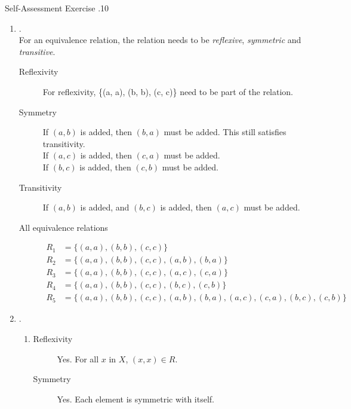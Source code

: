 \documentclass[\main/notes.tex]{subfiles}
\begin{document}
				\begin{exercise}{Self-Assessment Exercise \thechapter.10}
					\begin{enumerate}
						\item {}.\\
							For an equivalence relation, the relation needs to be \emph{reflexive}, \emph{symmetric} and \emph{transitive}.
							\begin{description}
								\item[Reflexivity] For reflexivity, \{(a, a), (b, b), (c, c)\} need to be part of the relation.
								\item[Symmetry] If $(a, b)$ is added, then $(b, a)$ must be added. This still satisfies transitivity.\\
								If $(a, c)$ is added, then $(c, a)$ must be added.\\
								If $(b, c)$ is added, then $(c, b)$ must be added.
								\item[Transitivity] If $(a, b)$ is added, and $(b, c)$ is added, then $(a, c)$ must be added.
								\item[All equivalence relations]
									\begin{align*}
										R_{1} &= \bigl\{(a, a), (b, b), (c, c)\bigr\}\\
										R_{2} &= \bigl\{(a, a), (b, b), (c, c), (a, b), (b, a)\bigr\}\\
										R_{3} &= \bigl\{(a, a), (b, b), (c, c), (a, c), (c, a)\bigr\}\\
										R_{4} &= \bigl\{(a, a), (b, b), (c, c), (b, c), (c, b)\bigr\}\\
										R_{5} &= \bigl\{(a, a), (b, b), (c, c), (a, b), (b, a), (a, c), (c, a), (b, c), (c, b)\bigr\}
									\end{align*} 
							\end{description}
						\item {}.
							\begin{enumerate}[label=(\alph*)]
								\item {}
									\begin{description}
										\item[Reflexivity] Yes. For all $x$ in $X$, $(x, x) \in R$.
										\item[Symmetry] Yes. Each element is symmetric with itself.

\end{description}
\end{enumerate}
\end{enumerate}
\end{exercise}
\end{document}
